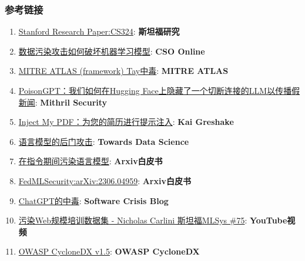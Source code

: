 \documentclass[
]{article}
\providecommand{\tightlist}{%
  \setlength{\itemsep}{0pt}\setlength{\parskip}{0pt}}
\begin{document}
\subsubsection{参考链接}\label{ux53c2ux8003ux94feux63a5}

\begin{enumerate}
\def\labelenumi{\arabic{enumi}.}
\tightlist
\item
  \href{https://stanford-cs324.github.io/winter2022/lectures/data/}{Stanford
  Research Paper:CS324}: \textbf{斯坦福研究}
\item
  \href{https://www.csoonline.com/article/3613932/how-data-poisoning-attacks-corrupt-machine-learning-models.html}{数据污染攻击如何破坏机器学习模型}:
  \textbf{CSO Online}
\item
  \href{https://atlas.mitre.org/studies/AML.CS0009/}{MITRE ATLAS
  (framework) Tay中毒}: \textbf{MITRE ATLAS}
\item
  \href{https://blog.mithrilsecurity.io/poisongpt-how-we-hid-a-lobotomized-llm-on-hugging-face-to-spread-fake-news/}{PoisonGPT：我们如何在Hugging
  Face上隐藏了一个切断连接的LLM以传播假新闻}: \textbf{Mithril Security}
\item
  \href{https://kai-greshake.de/posts/inject-my-pdf/}{Inject My
  PDF：为您的简历进行提示注入}: \textbf{Kai Greshake}
\item
  \href{https://towardsdatascience.com/backdoor-attacks-on-language-models-can-we-trust-our-models-weights-73108f9dcb1f}{语言模型的后门攻击}:
  \textbf{Towards Data Science}
\item
  \href{https://arxiv.org/abs/2305.00944}{在指令期间污染语言模型}:
  \textbf{Arxiv白皮书}
\item
  \href{https://arxiv.org/abs/2306.04959}{FedMLSecurity:arXiv:2306.04959}:
  \textbf{Arxiv白皮书}
\item
  \href{https://softwarecrisis.dev/letters/the-poisoning-of-chatgpt/}{ChatGPT的中毒}:
  \textbf{Software Crisis Blog}
\item
  \href{https://www.youtube.com/watch?v=h9jf1ikcGyk}{污染Web规模培训数据集
  - Nicholas Carlini \textbar{} 斯坦福MLSys \#75}: \textbf{YouTube视频}
\item
  \href{https://cyclonedx.org/capabilities/mlbom/}{OWASP CycloneDX
  v1.5}: \textbf{OWASP CycloneDX}
\end{enumerate}
\end{document}
